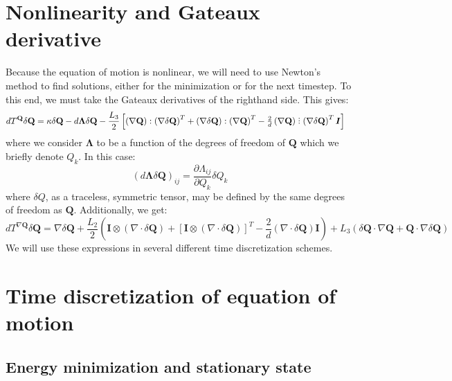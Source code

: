 \documentclass[reqno]{article}
\newcommand{\Q}{\mathbf{Q}}
\newcommand{\bLambda}{\boldsymbol{\Lambda}}
\begin{document}
\section{Nonlinearity and Gateaux derivative}

Because the equation of motion is nonlinear, we will need to use Newton's method to find solutions, either for the minimization or for the next timestep.
To this end, we must take the Gateaux derivatives of the righthand side.
This gives:
\begin{equation}
\begin{split}
    dT^\Q \delta \Q
    &=
    \kappa \delta \Q
    - d\bLambda \delta \Q
    - \frac{L_3}{2} \left[
        \left( \nabla \Q \right) : \left( \nabla \delta \Q \right)^T
        + \left( \nabla \delta \Q \right) : \left( \nabla \Q \right)^T
        - \tfrac{2}{d} \left( \nabla \Q \right) \divby \left( \nabla \delta \Q \right)^T \boldsymbol I
    \right]
\end{split}
\end{equation}
where we consider $\bLambda$ to be a function of the degrees of freedom of $\Q$ which we briefly denote $Q_k$.
In this case:
\begin{equation}
    \left( d \bLambda \delta \Q \right)_{ij}
    =
    \frac{\partial \Lambda_{ij}}{\partial Q_k} \delta Q_k
\end{equation}
where $\delta Q$, as a traceless, symmetric tensor, may be defined by the same degrees of freedom as $\Q$.
Additionally, we get:
\begin{equation}
    dT^{\nabla \Q} \delta \Q
    =
    \nabla \delta \Q
    + \frac{L_2}{2} \left(
        \mathbf I \otimes \left( \nabla \cdot \delta \Q \right)
        + \left[ \mathbf I \otimes \left( \nabla \cdot \delta \Q \right) \right]^T
        - \frac{2}{d} \left( \nabla \cdot \delta \Q \right) \mathbf I
    \right)
    +
    L_3 \left(
        \delta \Q \cdot \nabla \Q
        + \Q \cdot \nabla \delta \Q
    \right)
\end{equation}
We will use these expressions in several different time discretization schemes.

\section{Time discretization of equation of motion}

\subsection{Energy minimization and stationary state}
\end{document}
